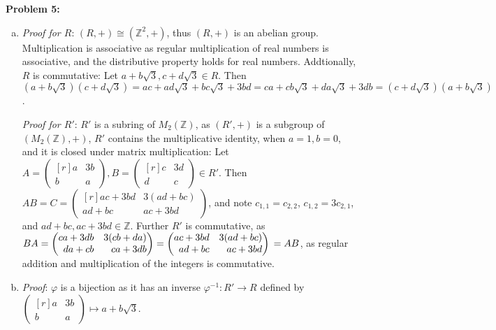 \documentclass[12pt, letterpaper]{article}
\newenvironment{problem}
    [1]
    {\noindent \textbf{Problem #1:}}
    {\vspace{3mm}}
\begin{document}
\begin{problem}{5}
    \begin{enumerate}[(a)]
        \item \emph{Proof for $R$}: $(R, +) \cong (\mathbb{Z}^2, +)$, thus $(R, +)$ is an abelian 
        group. Multiplication is associative as regular multiplication of real numbers is associative,
        and the distributive property holds for real numbers. Addtionally, $R$ is commutative: Let
        $a + b\sqrt{3}, c + d\sqrt{3} \in R$. Then $(a + b\sqrt{3})(c + d\sqrt{3}) = ac + ad\sqrt{3}
        + bc\sqrt{3} + 3bd = ca + cb\sqrt{3} + da\sqrt{3} + 3db = (c + d\sqrt{3})(a + b\sqrt{3})$.

        \bigskip\noindent 
        \emph{Proof for $R'$}: $R'$ is a subring of $M_2(\mathbb{Z})$, as $(R', +)$ is a subgroup of
        $(M_2(\mathbb{Z}), +)$, $R'$ contains the multiplicative identity, when $a = 1, b = 0$, and 
        it is closed under matrix multiplication: Let $A = \begin{pmatrix*}[r] a & 3b \\ b & a 
        \end{pmatrix*}, B = \begin{pmatrix*}[r] c & 3d \\ d & c \end{pmatrix*} \in R'$. Then $AB = 
        C = \begin{pmatrix*}[r] ac + 3bd & 3(ad + bc) \\ ad + bc & ac + 3bd\end{pmatrix*}$, and note
        $c_{1,1} = c_{2,2}$, $c_{1,2} = 3c_{2,1}$, and $ad + bc, ac + 3bd \in \mathbb{Z}$. Further $R'$ 
        is commutative, as $BA = \begin{pmatrix*}[r] ca + 3db & 3(cb + da) \\ da + cb & ca + 3db
        \end{pmatrix*} = \begin{pmatrix*}[r] ac + 3bd & 3(ad + bc) \\ ad + bc & ac + 3bd\end{pmatrix*}
        \\= AB$, as regular addition and multiplication of the integers is commutative.

        \item \emph{Proof}: $\varphi$ is a bijection as it has an inverse $\varphi^{-1}: R' \rightarrow
        R$ defined by $\begin{pmatrix*}[r] a & 3b \\ b & a \end{pmatrix*} \longmapsto a + b\sqrt{3}$.


\end{enumerate}
\end{problem}
\end{document}

